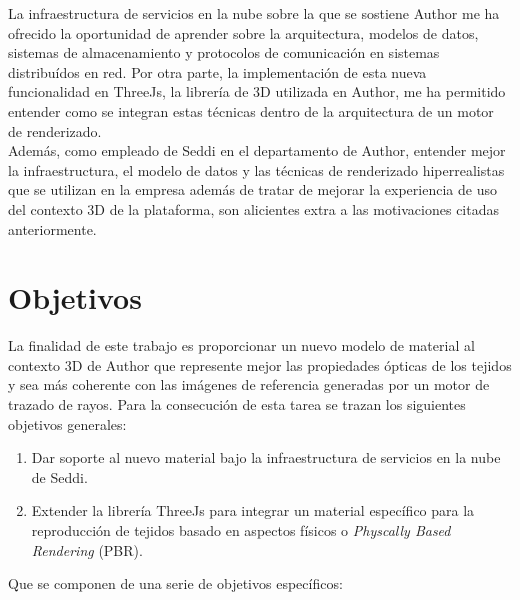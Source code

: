 La infraestructura de servicios en la nube sobre la que se sostiene Author me ha ofrecido la oportunidad de
aprender sobre la arquitectura, modelos de datos, sistemas de almacenamiento y protocolos de comunicaci\'on en sistemas distribu\'idos
en red. Por otra parte, la implementaci\'on de esta nueva funcionalidad en ThreeJs, la librer\'ia de 3D utilizada en Author,
me ha permitido entender como se integran estas t\'ecnicas dentro de la arquitectura de un motor de renderizado.\\

Adem\'as, como empleado de Seddi en el departamento de Author, entender mejor la infraestructura, el modelo de datos y las t\'ecnicas
de renderizado hiperrealistas que se utilizan en la empresa adem\'as de tratar de mejorar la experiencia de uso del contexto 3D de
la plataforma, son alicientes extra a las motivaciones citadas anteriormente.

\section{Objetivos}

La finalidad de este trabajo es proporcionar un nuevo modelo de material al contexto 3D de Author que represente mejor las propiedades
\'opticas de los tejidos y sea m\'as coherente con las im\'agenes de referencia generadas por un motor de trazado de rayos. Para la
consecuci\'on de esta tarea se trazan los siguientes objetivos generales:

\begin{enumerate}[label=(\roman*)]
	\item Dar soporte al nuevo material bajo la infraestructura de servicios en la nube de Seddi.
  \item Extender la librer\'ia ThreeJs para integrar un material espec\'ifico para la reproducci\'on de tejidos basado
  en aspectos f\'isicos o \textit{Physcally Based Rendering} (PBR).
\end{enumerate}

Que se componen de una serie de objetivos espec\'ificos:

